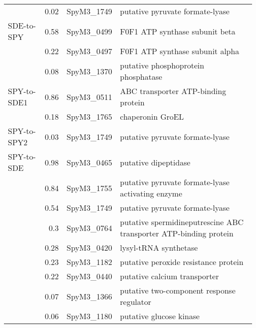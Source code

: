 \documentclass[10pt]{article}
\begin{document}
\begin{table}[!ht]
\begin{centering}
\begin{tabular}{lrll}
 & 0.02 & SpyM3\_1749 & putative pyruvate formate-lyase\\
SDE-to-SPY & 0.58 & SpyM3\_0499 & F0F1 ATP synthase subunit beta\\
 & 0.22 & SpyM3\_0497 & F0F1 ATP synthase subunit alpha\\
 & 0.08 & SpyM3\_1370 & putative phosphoprotein phosphatase\\
SPY-to-SDE1 & 0.86 & SpyM3\_0511 & ABC transporter ATP-binding protein\\
 & 0.18 & SpyM3\_1765 & chaperonin GroEL\\
SPY-to-SPY2 & 0.03 & SpyM3\_1749 & putative pyruvate formate-lyase\\
SPY-to-SDE & 0.98 & SpyM3\_0465 & putative dipeptidase\\
 & 0.84 & SpyM3\_1755 & putative pyruvate formate-lyase activating enzyme\\
 & 0.54 & SpyM3\_1749 & putative pyruvate formate-lyase\\
 & 0.3 & SpyM3\_0764 & putative spermidineputrescine ABC transporter ATP-binding protein\\
 & 0.28 & SpyM3\_0420 & lysyl-tRNA synthetase\\
 & 0.23 & SpyM3\_1182 & putative peroxide resistance protein\\
 & 0.22 & SpyM3\_0440 & putative calcium transporter\\
 & 0.07 & SpyM3\_1366 & putative two-component response regulator\\
 & 0.06 & SpyM3\_1180 & putative glucose kinase\\
\hline 
\end{tabular}
\par\end{centering}
\label{tab:virrecomb}
\end{table}
\end{document}
